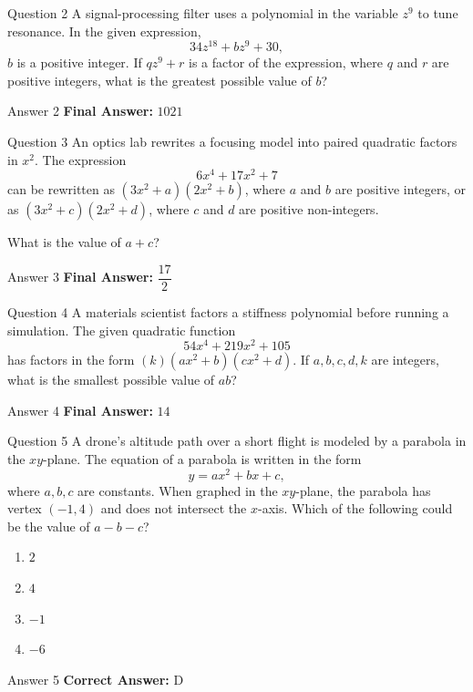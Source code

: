 \documentclass{beamer}
\begin{document}
\begin{frame}{Question 2}
\small
A signal-processing filter uses a polynomial in the variable \(z^9\) to tune resonance. In the given expression,
\[
34z^{18} + b z^9 + 30,
\]
\(b\) is a positive integer. If \(qz^9 + r\) is a factor of the expression, where \(q\) and \(r\) are positive integers, what is the greatest possible value of \(b\)?
\end{frame}
\begin{frame}{Answer 2}
\small
\textbf{Final Answer:} $\boxed{1021}$
\end{frame}

\begin{frame}{Question 3}
\small
An optics lab rewrites a focusing model into paired quadratic factors in \(x^2\). The expression
\[
6x^4 + 17x^2 + 7
\]
can be rewritten as \((3x^2 + a)(2x^2 + b)\), where \(a\) and \(b\) are positive integers, or as \((3x^2 + c)(2x^2 + d)\), where \(c\) and \(d\) are positive non-integers.

What is the value of \(a + c\)?
\end{frame}
\begin{frame}{Answer 3}
\small
\textbf{Final Answer:} $\boxed{\dfrac{17}{2}}$
\end{frame}

\begin{frame}{Question 4}
\small
A materials scientist factors a stiffness polynomial before running a simulation. The given quadratic function
\[
54x^4 + 219x^2 + 105
\]
has factors in the form \((k)(ax^2 + b)(cx^2 + d)\). If \(a, b, c, d, k\) are integers, what is the smallest possible value of \(ab\)?
\end{frame}
\begin{frame}{Answer 4}
\small
\textbf{Final Answer:} $\boxed{14}$
\end{frame}

\begin{frame}{Question 5}
\small
A drone’s altitude path over a short flight is modeled by a parabola in the \(xy\)-plane. The equation of a parabola is written in the form
\[
y = ax^2 + bx + c,
\]
where \(a, b, c\) are constants. When graphed in the \(xy\)-plane, the parabola has vertex \((-1, 4)\) and does not intersect the \(x\)-axis. Which of the following could be the value of \(a - b - c\)?
\vspace{0.35cm}
\begin{enumerate}
    \item[A.] \(2\)
    \item[B.] \(4\)
    \item[C.] \(-1\)
    \item[D.] \(-6\)
\end{enumerate}
\end{frame}
\begin{frame}{Answer 5}
\small
\textbf{Correct Answer:} D
\end{frame}
\end{document}
